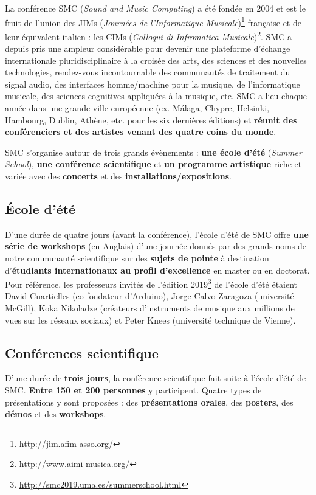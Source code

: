 \documentclass[fontsize=12pt]{scrartcl} %
\numberwithin{equation}{section} %
\numberwithin{figure}{section} %
\numberwithin{table}{section} %
\begin{document}
La conférence SMC (\textit{Sound and Music Computing}) a été fondée en 2004 et est le fruit de l'union des JIMs (\textit{Journées de l'Informatique Musicale})\footnote{\url{http://jim.afim-asso.org/}} française et de leur équivalent italien : les CIMs (\textit{Colloqui di Infromatica Musicale})\footnote{\url{http://www.aimi-musica.org/}}. SMC a depuis pris une ampleur considérable pour devenir une plateforme d’échange internationale pluridisciplinaire à la croisée des arts, des sciences et des nouvelles technologies, rendez-vous incontournable des communautés de traitement du signal audio, des interfaces homme/machine pour la musique, de l'informatique musicale, des sciences cognitives appliquées à la musique, etc. SMC a lieu chaque année dans une grande ville européenne (ex. Málaga, Chypre, Helsinki, Hambourg, Dublin, Athène, etc. pour les six dernières éditions) et \textbf{réunit des conférenciers et des artistes venant des quatre coins du monde}.

SMC s'organise autour de trois grands évènements : \textbf{une école d'été} (\textit{Summer School}), \textbf{une conférence scientifique} et \textbf{un programme artistique} riche et variée avec des \textbf{concerts} et des \textbf{installations/expositions}.

\subsection{École d'été}

D'une durée de quatre jours (avant la conférence), l'école d'été de SMC offre \textbf{une série de workshops} (en Anglais) d'une journée donnés par des grands noms de notre communauté scientifique sur des \textbf{sujets de pointe} à destination d'\textbf{étudiants internationaux au profil d'excellence} en master ou en doctorat. Pour référence, les professeurs invités de l'édition 2019\footnote{\url{http://smc2019.uma.es/summerschool.html}} de l'école d'été étaient David Cuartielles (co-fondateur d'Arduino), Jorge Calvo-Zaragoza (université McGill), Koka Nikoladze (créateurs d'instruments de musique aux millions de vues sur les réseaux sociaux) et Peter Knees (université technique de Vienne). 

\subsection{Conférences scientifique}

D'une durée de \textbf{trois jours}, la conférence scientifique fait suite à l'école d'été de SMC. \textbf{Entre 150 et 200 personnes} y participent. Quatre types de présentations y sont proposées : des \textbf{présentations orales}, des \textbf{posters}, des \textbf{démos} et des \textbf{workshops}. 
\end{document}
